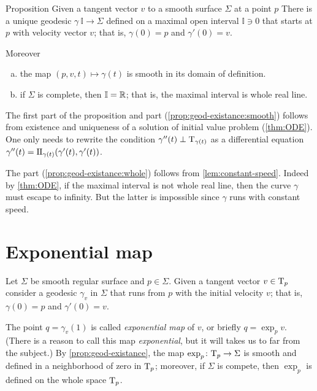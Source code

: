 \begin{thm}{Proposition}\label{prop:geod-existance} 
Given a tangent vector $v$ to a smooth surface $\Sigma$ at a point $p$
There is a unique geodesic $\gamma\:\mathbb{I}\to \Sigma$ defined on a maximal open interval $\mathbb{I}\ni 0$ that starts at $p$ with velocity vector $v$;
that is, $\gamma(0)=p$ and $\gamma'(0)=v$.

Moreover
\begin{enumerate}[(a)]
\item\label{prop:geod-existance:smooth} the map $(p,v,t)\mapsto \gamma(t)$ is smooth in its domain of definition.
\item\label{prop:geod-existance:whole} if $\Sigma$ is complete, then $\mathbb{I}=\mathbb{R}$; that is, the maximal interval is whole real line.
\end{enumerate}

\end{thm}

The first part of the proposition and part (\ref{prop:geod-existance:smooth}) follows from existence and uniqueness of a solution of initial value problem (\ref{thm:ODE}).
One only needs to rewrite the condition $\gamma''(t)\perp\mathrm{T}_{\gamma(t)}$ as a differential equation 
$\gamma''(t)=\mathrm{I}\hskip-.02em\mathrm{I}_{\gamma(t)}(\gamma'(t),\gamma'(t))$.

The part (\ref{prop:geod-existance:whole}) follows from \ref{lem:constant-speed}.
Indeed by \ref{thm:ODE}, if the maximal interval is not whole real line, then the curve $\gamma$ must escape to infinity. %
But the latter is impossible since $\gamma$ runs with constant speed.
\qeds

\section*{Exponential map}

Let $\Sigma$ be smooth regular surface and $p\in \Sigma$.
Given a tangent vector $v\in \mathrm{T}_p$ consider a geodesic $\gamma_v$ in $\Sigma$ that runs from $p$ with the initial velocity $v$;  
that is, $\gamma(0)=p$ and $\gamma'(0)=v$.

The point $q=\gamma_v(1)$ is called \emph{exponential map} of $v$, or briefly $q=\exp_pv$.
(There is a reason to call this map \emph{exponential}, but it will takes us to far from the subject.)
By \ref{prop:geod-existance}, the map $\exp_p\colon\mathrm{T}_p\to \Sigma$ is smooth and defined in a neighborhood of zero in $\mathrm{T}_p$;
moreover, if $\Sigma$ is compete, then $\exp_p$ is defined on the whole space $\mathrm{T}_p$.

